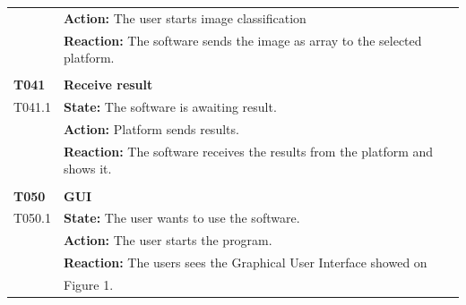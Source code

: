 \documentclass[parskip=full]{scrartcl}
\begin{document}
\begin{tabular}{p{2cm}p{12cm}}
& \textbf{Action:} The user starts image classification  \\
& \textbf{Reaction:} The software sends the image as array to the selected platform.\\
& \\
\textbf{T041} & \textbf{Receive result}\\
T041.1 & \textbf{State:} The software is awaiting result. \\
& \textbf{Action:} Platform sends results. \\
& \textbf{Reaction:} The software receives the results from the platform and shows it. \\
& \\
\textbf{T050} & \textbf{GUI} \\
T050.1 & \textbf{State:} The user wants to use the software.\\
& \textbf{Action:} The user starts the program.  \\
& \textbf{Reaction:} The users sees the Graphical User Interface showed on \\
& Figure 1. \\
\end{tabular}
\newpage
\end{document}

